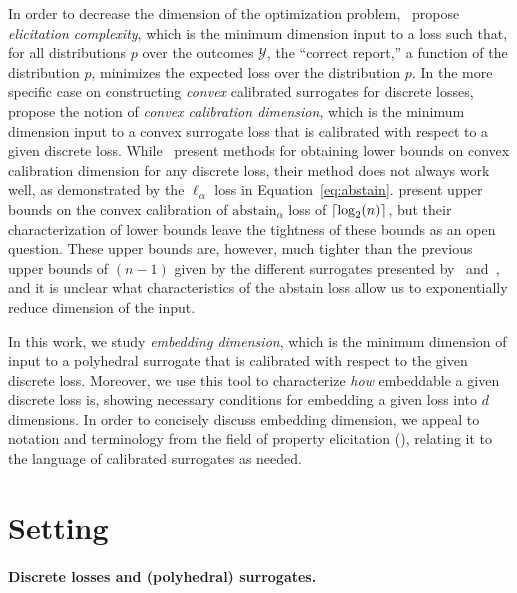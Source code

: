 \documentclass[anon]{colt2020} %
\newcommand{\abstain}[1]{\mathrm{abstain}_{#1}}
\newcommand{\Y}{\mathcal{Y}}
\newcommand{\ellabs}[1]{\ell_{#1}}
\DeclarePairedDelimiter\ceil{\lceil}{\rceil}
\begin{document}
In order to decrease the dimension of the optimization problem,~\cite{frongillo2015elicitation} propose \emph{elicitation complexity}, which is the minimum dimension input to a loss such that, for all distributions $p$ over the outcomes $\Y$, the ``correct report,'' a function of the distribution $p$, minimizes the expected loss over the distribution $p$.
In the more specific case on constructing \emph{convex} calibrated surrogates for discrete losses,~\cite{ramaswamy2016convex} propose the notion of \emph{convex calibration dimension}, which is the minimum dimension input to a convex surrogate loss that is calibrated with respect to a given discrete loss.
While~\cite{ramaswamy2016convex} present methods for obtaining lower bounds on convex calibration dimension for any discrete loss, their method does not always work well, as demonstrated by the $\ellabs{\alpha}$ loss in Equation~\eqref{eq:abstain}.
\cite{ramaswamy2018consistent} present upper bounds on the convex calibration of $\abstain{\alpha}$ loss of $\ceil{\log_2(n)}$, but their characterization of lower bounds leave the tightness of these bounds as an open question.
These upper bounds are, however, much tighter than the previous upper bounds of $(n-1)$ given by the different surrogates presented by~\cite{crammer2001algorithmic} and~\cite{rifkin2004defense}, and it is unclear what characteristics of the abstain loss allow us to exponentially reduce dimension of the input.

In this work, we study \emph{embedding dimension}, which is the minimum dimension of input to a polyhedral surrogate that is calibrated with respect to the given discrete loss.
Moreover, we use this tool to characterize \emph{how} embeddable a given discrete loss is, showing necessary conditions for embedding a given loss into $d$ dimensions.
In order to concisely discuss embedding dimension, we appeal to notation and terminology from the field of property elicitation (\cite{frongillo2015vector-valued, gneiting2007strictly, lambert2009eliciting, osband1985information-eliciting, savage1971elicitation}), relating it to the language of calibrated surrogates as needed.

\section{Setting}

\paragraph{Discrete losses and (polyhedral) surrogates.}
\end{document}
